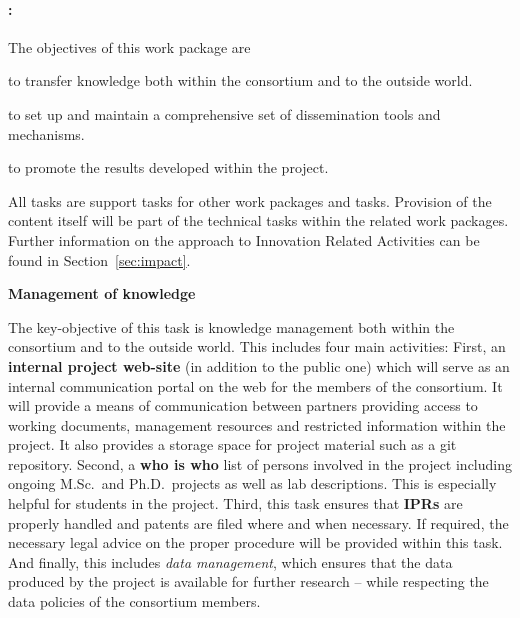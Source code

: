 
\paragraph{\WPInnovation: \WPInnovationTitle \\}

{\noindent\wptablefont

\wptableheaderB{\WPInnovationVW}{\WPInnovationETHZ}{\WPInnovationIBM}{\WPInnovationCLUJ}{\WPInnovationPRAGUE}



The objectives of this work package are
 \begin{denseItemize}
 \item to transfer knowledge both within the consortium and to the outside world.
 \item to set up and maintain a comprehensive set of dissemination tools and mechanisms.
 \item to promote the results developed within the project.
\end{denseItemize}

All \WPInnovation{} tasks are support tasks for other work packages and tasks. Provision of the content itself will be part of the technical tasks within the related work packages. Further information on the \Project{} approach to Innovation Related Activities can be found in Section~\ref{sec:impact}.

\begin{tasks}{\WPInnovationNo}

\item {\bf Management of knowledge}
\label{task:wpinnovation:knowledge}
\taskpartners{\PRAGUE}{\ETHZ}

The key-objective of this task is knowledge management both within the consortium and to the outside world.  This includes four main activities: First, an
{\bf internal project web-site} (in addition to the public one) which will serve as an internal communication portal on the web for the members of the consortium.  It will provide a means of communication between partners providing access to working documents, management resources and restricted information within the project.  It also provides a storage space for project material such as a git repository. Second, a {\bf who is who} list of persons
involved in the \Project{} project including ongoing M.Sc.~and Ph.D.~projects as well as lab descriptions. This is especially helpful for students in the \Project{} project.  Third, this task ensures that {\bf IPRs} are properly handled and patents are filed where and when necessary. If required, the necessary legal advice on the proper procedure will be provided within this task. And finally, this includes {\em data management}, which ensures that the data produced by the project is available for further research  -- while respecting the data policies of the consortium members.


\end{tasks}}
